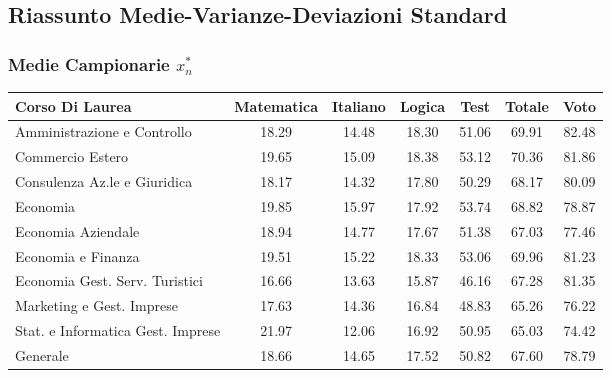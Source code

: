\thispagestyle{empty}
\subsection{Riassunto Medie-Varianze-Deviazioni Standard}
\subsubsection{Medie Campionarie $x^*_n$}
\begin{center}
\begin{tabular}{lcccccc}
  \toprule
  Corso Di Laurea & Matematica & Italiano & Logica & Test & Totale & Voto \\ 
  \midrule
  Amministrazione e Controllo & 18.29 & 14.48 & 18.30 & 51.06 & 69.91 & 82.48 \\ 
  Commercio Estero & 19.65 & 15.09 & 18.38 & 53.12 & 70.36 & 81.86 \\ 
  Consulenza Az.le e Giuridica & 18.17 & 14.32 & 17.80 & 50.29 & 68.17 & 80.09 \\ 
  Economia & 19.85 & 15.97 & 17.92 & 53.74 & 68.82 & 78.87 \\ 
  Economia Aziendale & 18.94 & 14.77 & 17.67 & 51.38 & 67.03 & 77.46 \\ 
  Economia e Finanza & 19.51 & 15.22 & 18.33 & 53.06 & 69.96 & 81.23 \\ 
  Economia Gest. Serv. Turistici & 16.66 & 13.63 & 15.87 & 46.16 & 67.28 & 81.35 \\ 
  Marketing e Gest. Imprese & 17.63 & 14.36 & 16.84 & 48.83 & 65.26 & 76.22 \\ 
  Stat. e Informatica Gest. Imprese & 21.97 & 12.06 & 16.92 & 50.95 & 65.03 & 74.42 \\ 
  \addlinespace
  Generale & 18.66 & 14.65 & 17.52 & 50.82 & 67.60 & 78.79 \\ 
  \bottomrule
\end{tabular}
\end{center}

